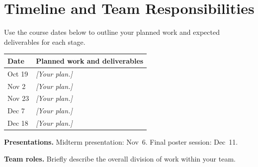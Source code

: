 \documentclass[conference,10pt,letterpaper]{IEEEtran}
\newcommand{\field}[1]{\textit{[#1]}}
\begin{document}
\section{Timeline and Team Responsibilities}
Use the course dates below to outline your planned work and expected
deliverables for each stage.

\begin{center}
\begin{tabularx}{\columnwidth}{@{}P{0.23\columnwidth}Y@{}}
\toprule
\textbf{Date} & \textbf{Planned work and deliverables} \\
\midrule
Oct 19 & \field{Your plan.} \\
Nov 2 & \field{Your plan.} \\
Nov 23 & \field{Your plan.} \\
Dec 7 & \field{Your plan.} \\
Dec 18 & \field{Your plan.} \\
\bottomrule
\end{tabularx}
\end{center}

\textbf{Presentations.} Midterm presentation: Nov~6. Final poster session: Dec~11.

\textbf{Team roles.} Briefly describe the overall division of work within
your team.



\end{document}
